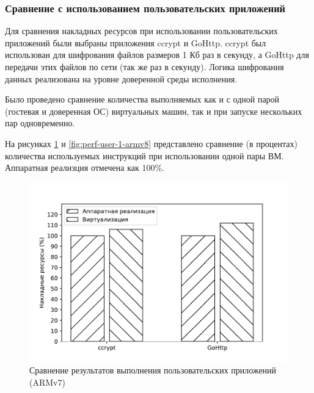 \subsubsection{Сравнение с использованием пользовательских приложений}

Для сравнения накладных ресурсов при использовании пользовательских приложений были выбраны приложения ccrypt и GoHttp. ccrypt был использован для шифрования файлов размеров 1 Кб раз в секунду, а GoHttp для передачи этих файлов по сети (так же раз в секунду). Логика шифрования данных реализована на уровне доверенной среды исполнения. 

Было проведено сравнение количества выполняемых как и с одной парой (гостевая и доверенная ОС) виртуальных машин, так и при запуске нескольких пар одновременно.

На рисунках \ref{fig:perf-user-1-armv7} и \ref{fig:perf-user-1-armv8} представлено сравнение (в процентах) количества используемых инструкций при использовании одной пары ВМ. Аппаратная реализция отмечена как 100\%.

\begin{figure}[h]
	\centering
	\includegraphics[width=\textwidth]{img/user-1-armv7.pdf}
	\caption{Сравнение результатов выполнения пользовательских приложений (ARMv7)}
	\label{fig:perf-user-1-armv7}
\end{figure}

